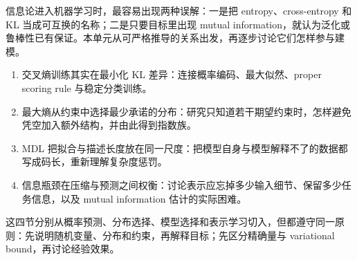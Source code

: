 信息论进入机器学习时，最容易出现两种误解：一是把 entropy、cross-entropy 和 KL 当成可互换的名称；二是只要目标里出现 mutual information，就认为泛化或鲁棒性已有保证。本单元从可严格推导的关系出发，再逐步讨论它们怎样参与建模。

\begin{enumerate}
\def\labelenumi{\arabic{enumi}.}
\tightlist
\item
  交叉熵训练其实在最小化 KL 差异：连接概率编码、最大似然、proper scoring rule 与稳定分类训练。
\item
  最大熵从约束中选择最少承诺的分布：研究只知道若干期望约束时，怎样避免凭空加入额外结构，并由此得到指数族。
\item
  MDL 把拟合与描述长度放在同一尺度：把模型自身与模型解释不了的数据都写成码长，重新理解复杂度惩罚。
\item
  信息瓶颈在压缩与预测之间权衡：讨论表示应忘掉多少输入细节、保留多少任务信息，以及 mutual information 估计的实际困难。
\end{enumerate}

这四节分别从概率预测、分布选择、模型选择和表示学习切入，但都遵守同一原则：先说明随机变量、分布和约束，再解释目标；先区分精确量与 variational bound，再讨论经验效果。

